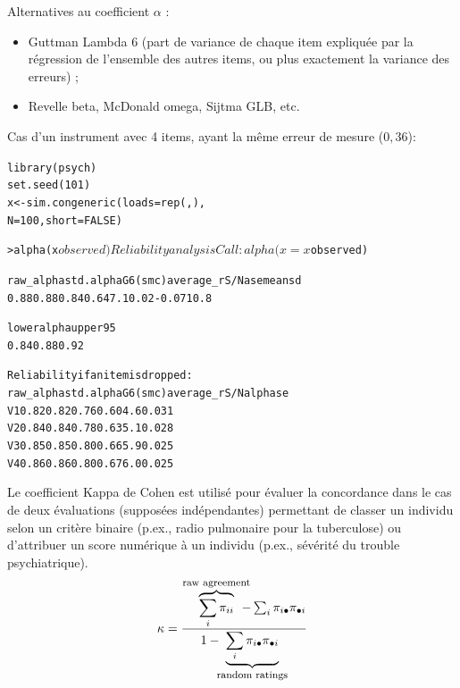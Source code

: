 Alternatives au coefficient $\alpha$ :
\begin{itemize}
\item Guttman Lambda 6 (part de variance de chaque item expliquée par la
  régression de l'ensemble des autres items, ou plus exactement la variance des
  erreurs) ;
\item Revelle beta, McDonald omega, Sijtma GLB, etc.\autocite{zinbarg05}
\end{itemize}


Cas d'un instrument avec 4 items, ayant la même erreur de mesure ($0,36$):
\begin{alltt}
library(psych)
set.seed(101)
\textcolor{Apricot}{x} <- sim.congeneric(loads = rep(, ), \hfill{} 
                    N = 100, short = FALSE)
\end{alltt}


\begin{alltt}\small
> alpha(x$observed)

Reliability analysis
Call: alpha(x = x$observed)

  raw_alpha std.alpha G6(smc) average_r S/N  ase   mean  sd
      0.88      0.88    0.84      0.64 7.1 0.02 -0.071 0.8

 lower alpha upper     95%
0.84 0.88 0.92

 Reliability if an item is dropped:
   raw_alpha std.alpha G6(smc) average_r S/N alpha se
V1      0.82      0.82    0.76      0.60 4.6    0.031
V2      0.84      0.84    0.78      0.63 5.1    0.028
V3      0.85      0.85    0.80      0.66 5.9    0.025
V4      0.86      0.86    0.80      0.67 6.0    0.025
\end{alltt}


Le coefficient Kappa de Cohen est utilisé pour évaluer la concordance dans le
cas de deux évaluations (supposées indépendantes) permettant de classer un
individu selon un critère binaire\autocite{cohen60} (p.ex., radio pulmonaire
pour la tuberculose) ou d'attribuer un score numérique à un
individu\autocite{cohen68} (p.ex., sévérité du trouble psychiatrique).
\begin{equation}
  \kappa=\frac{\overbrace{\sum_i\pi_{ii}}^{\textrm{\footnotesize raw agreement}}\hskip-2ex-\sum_i\pi_{i\bullet}\pi_{\bullet
      i}}{1-\hskip-1ex\underbrace{\sum_i\pi_{i\bullet}\pi_{\bullet i}}_{\textrm{\footnotesize random ratings}}}
\end{equation}


